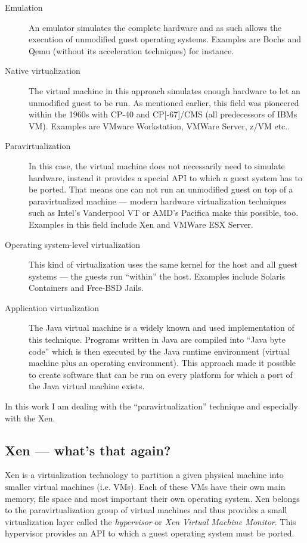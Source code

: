 \begin{description}
\item[Emulation] An  emulator simulates the complete hardware  and as such
  allows the execution of unmodified guest operating systems. Examples are
  Bochs and Qemu (without its acceleration techniques) for instance.
\item[Native vir\-tu\-ali\-za\-tion] The  virtual machine in this approach
  simulates  enough hardware  to let  an unmodified  guest to  be  run. As
  mentioned earlier, this field was  pioneered within the 1960s with CP-40
  and  CP[-67]/CMS (all  predecessors of  IBMs VM).   Examples  are VMware
  Workstation, VMWare Server, z/VM etc..
\item[Paravirtualization]  In  this case,  the  virtual  machine does  not
  necessarily need to simulate hardware, instead it provides a special API
  to which a guest system has to  be ported. That means one can not run an
  unmodified guest on top of a paravirtualized machine --- modern hardware
  virtualization  techniques  such  as  Intel's  Vanderpool  VT  or  AMD's
  Pacifica make this possible, too. Examples in this field include Xen and
  VMWare ESX Server.
\item[Operating system-level  virtualization] This kind  of virtualization
  uses the same  kernel for the host and all guest  systems --- the guests
  run  ``within''  the  host.   Examples include  Solaris  Containers  and
  Free-BSD Jails.
\item[Application  virtualization] The  Java virtual  machine is  a widely
  known  and used implementation  of this  technique. Programs  written in
  Java are compiled into ``Java byte  code'' which is then executed by the
  Java   runtime   environment   (virtual   machine  plus   an   operating
  environment).  This  approach made it  possible to create  software that
  can  be run  on every  platform for  which a  port of  the  Java virtual
  machine exists.
\end{description}

In this  work I am  dealing with the ``paravirtualization''  technique and
especially with the Xen.

\subsection{Xen --- what's that again?}

Xen  \cite{xen}  is  a  virtualization  technology to  partition  a  given
physical machine into smaller virtual  machines (i.e. VMs).  Each of these
VMs have  their own main memory,  file space and most  important their own
operating system.  Xen belongs  to the paravirtualization group of virtual
machines  and  thus  provides  a  small virtualization  layer  called  the
\emph{hypervisor} or  \emph{Xen Virtual Machine  Monitor}. This hypervisor
provides an API to which a guest operating system must be ported.


